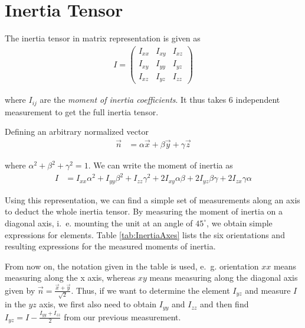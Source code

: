 \documentclass[journal]{IEEEtran}
\begin{document}
\section{Inertia Tensor}

The inertia tensor in matrix representation is given as
\begin{align}
	I = 
	\begin{pmatrix}
		I_{xx} & I_{xy} & I_{xz} \\
		I_{xy} & I_{yy} & I_{yz} \\
		I_{xz} & I_{yz} & I_{zz}
	\end{pmatrix}
\end{align}

where $I_{ij}$ are the \emph{moment of inertia coefficients}.
It thus takes 6 independent measurement to get the full inertia tensor.

Defining an arbitrary normalized vector
\begin{align}
	\vec{n} & = \alpha \vec{x} + \beta \vec{y} + \gamma \vec{z}
\end{align}

where $\alpha^2 + \beta^2 + \gamma^2 = 1$.
We can write the moment of inertia as \cite{book:goldstein}
\begin{align}
	I & = I_{xx} \alpha^2 + I_{yy} \beta^2 + I_{zz} \gamma^2 + 2 I_{xy} \alpha \beta + 2 I_{yz} \beta \gamma + 2 I_{zx} \gamma \alpha
\end{align}

Using this representation, we can find a simple set of measurements along an axis to deduct the whole inertia tensor.
By measuring the moment of inertia on a diagonal axis, i.~e. mounting the unit at an angle of $45^{\circ}$, we obtain simple expressions for elements.
Table \ref{tab:InertiaAxes} lists the six orientations and resulting expressions for the measured moments of inertia.

From now on, the notation given in the table is used, e.~g. orientation $xx$ means measuring along the x axis, whereas $xy$ means measuring along the diagonal axis given by $\vec{n} = \frac{\vec{x} + \vec{y}}{\sqrt{2}}$.
Thus, if we want to determine the element $I_{yz}$ and measure $I$ in the $yz$ axis, we first also need to obtain $I_{yy}$ and $I_{zz}$ and then find $I_{yz} = I - \frac{I_{yy} + I_{zz}}{2}$ from our previous measurement.
\end{document}
